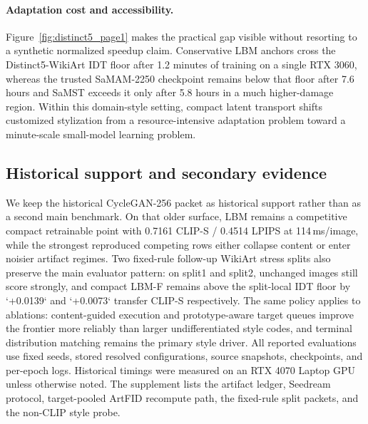\documentclass[letterpaper]{article}
\begin{document}

\DistinctFiveTimingTableLeibniz

\paragraph{Adaptation cost and accessibility.}
Figure~\ref{fig:distinct5_page1} makes the practical gap visible without resorting to a synthetic normalized speedup claim. Conservative LBM anchors cross the Distinct5-WikiArt IDT floor after 1.2 minutes of training on a single RTX 3060, whereas the trusted SaMAM-2250 checkpoint remains below that floor after 7.6 hours and SaMST exceeds it only after 5.8 hours in a much higher-damage region. Within this domain-style setting, compact latent transport shifts customized stylization from a resource-intensive adaptation problem toward a minute-scale small-model learning problem.

\subsection{Historical support and secondary evidence}
We keep the historical CycleGAN-256 packet as historical support rather than as a second main benchmark. On that older surface, LBM remains a competitive compact retrainable point with 0.7161 CLIP-S / 0.4514 LPIPS at 114\,ms/image, while the strongest reproduced competing rows either collapse content or enter noisier artifact regimes. Two fixed-rule follow-up WikiArt stress splits also preserve the main evaluator pattern: on split1 and split2, unchanged images still score strongly, and compact LBM-F remains above the split-local IDT floor by `+0.0139` and `+0.0073` transfer CLIP-S respectively. The same policy applies to ablations: content-guided execution and prototype-aware target queues improve the frontier more reliably than larger undifferentiated style codes, and terminal distribution matching remains the primary style driver. All reported evaluations use fixed seeds, stored resolved configurations, source snapshots, checkpoints, and per-epoch logs. Historical timings were measured on an RTX 4070 Laptop GPU unless otherwise noted. The supplement lists the artifact ledger, Seedream protocol, target-pooled ArtFID recompute path, the fixed-rule split packets, and the non-CLIP style probe.
\end{document}
